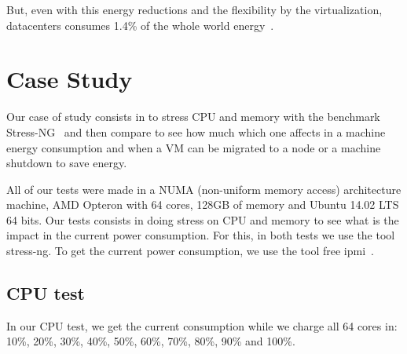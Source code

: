 \documentclass[runningheads,a4paper]{llncs}
\begin{document}
But, even with this energy reductions and the flexibility by the virtualization, datacenters consumes 1.4\% of the whole world energy~\cite{awada2014energy}.


\section{Case Study}\label{sec:study}
Our case of study consists in to stress CPU and memory with the benchmark Stress-NG~\cite{STRESSNG} and then compare to see how much which one affects in a machine energy consumption and when a VM can be migrated to a node or a machine shutdown to save energy.   %

All of our tests were made in a NUMA (non-uniform memory access) architecture machine, AMD Opteron with 64 cores, 128GB of memory and Ubuntu 14.02 LTS 64 bits. Our tests consists in doing stress on CPU and memory to see what is the impact in the current power consumption. For this, in both tests we use the tool stress-ng. To get the current power consumption, we use the tool free ipmi~\cite{freeIPMI}.


\subsection{CPU test}
In our CPU test, we get the current consumption while we charge all 64 cores in: 10\%, 20\%, 30\%, 40\%, 50\%, 60\%, 70\%, 80\%, 90\% and 100\%. %
\end{document}
